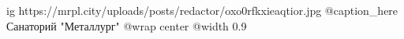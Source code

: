  
 
 
 
 

\ifcmt
  ig https://mrpl.city/uploads/posts/redactor/oxo0rfkxieaqtior.jpg
	@caption_here Санаторий "Металлург"
  @wrap center
  @width 0.9
\fi
